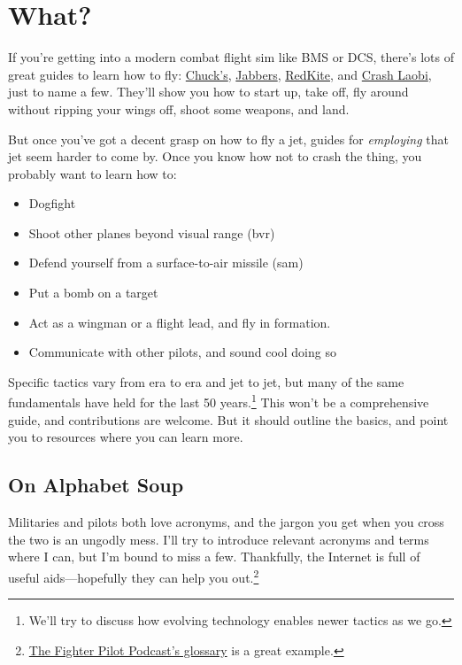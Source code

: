 \chapter{What?}

If you're getting into a modern combat flight sim like BMS or DCS,
there's lots of great guides to learn how to fly:
\href{https://www.mudspike.com/chucks-guides/}{Chuck's},
\href{https://www.youtube.com/channel/UCvXXUrGCF3wV3bbZ6pFQ00g}{Jabbers},
\href{https://www.youtube.com/user/RedKiteRender}{RedKite},
and
\href{https://www.youtube.com/channel/UCqH078Ef0HENo01LF3xwIvA}{Crash Laobi},
just to name a few.
They'll show you how to start up, take off, fly around
without ripping your wings off, shoot some weapons, and land.

But once you've got a decent grasp on how to fly a jet,
guides for \emph{employing} that jet seem harder to come by.
Once you know how not to crash the thing, you probably want to learn how to:
\begin{itemize}
\item Dogfight
\item Shoot other planes beyond visual range \ac{(bvr)}
\item Defend yourself from a surface-to-air missile \ac{(sam)}
\item Put a bomb on a target
\item Act as a wingman or a flight lead, and fly in formation.
\item Communicate with other pilots, and sound cool doing so
\end{itemize}

Specific tactics vary from era to era and jet to jet,
but many of the same fundamentals have held for the last 50
years.\punckern\footnote{We'll try to discuss how evolving technology
enables newer tactics as we go.}
This won't be a comprehensive guide,
and contributions are welcome.
But it should outline the basics, and point you to resources where you can
learn more.

\section{On Alphabet Soup}

Militaries and pilots both love acronyms,
and the jargon you get when you cross the two is an ungodly mess.
I'll try to introduce relevant acronyms and terms where I can,
but I'm bound to miss a few.
Thankfully, the Internet is full of useful aids---hopefully they can help you
out.\punckern\footnote{%
\href{https://www.fighterpilotpodcast.com/glossary/}{The Fighter Pilot Podcast's glossary}
is a great example.}
